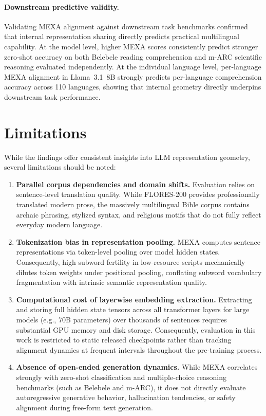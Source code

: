 \paragraph{Downstream predictive validity.}
Validating MEXA alignment against downstream task benchmarks confirmed that internal representation sharing directly predicts practical multilingual capability. At the model level, higher MEXA scores consistently predict stronger zero-shot accuracy on both Belebele reading comprehension and m-ARC scientific reasoning evaluated independently. At the individual language level, per-language MEXA alignment in Llama~3.1~8B strongly predicts per-language comprehension accuracy across 110 languages, showing that internal geometry directly underpins downstream task performance.

\section{Limitations}
\label{sec:conclusion-limitations}

While the findings offer consistent insights into LLM representation geometry, several limitations should be noted:

\begin{enumerate}
    \item \textbf{Parallel corpus dependencies and domain shifts.} Evaluation relies on sentence-level translation quality. While FLORES-200 provides professionally translated modern prose, the massively multilingual Bible corpus contains archaic phrasing, stylized syntax, and religious motifs that do not fully reflect everyday modern language.
    
    \item \textbf{Tokenization bias in representation pooling.} MEXA computes sentence representations via token-level pooling over model hidden states. Consequently, high subword fertility in low-resource scripts mechanically dilutes token weights under positional pooling, conflating subword vocabulary fragmentation with intrinsic semantic representation quality.
    
    \item \textbf{Computational cost of layerwise embedding extraction.} Extracting and storing full hidden state tensors across all transformer layers for large models (e.g., 70B parameters) over thousands of sentences requires substantial GPU memory and disk storage. Consequently, evaluation in this work is restricted to static released checkpoints rather than tracking alignment dynamics at frequent intervals throughout the pre-training process.
    
    \item \textbf{Absence of open-ended generation dynamics.} While MEXA correlates strongly with zero-shot classification and multiple-choice reasoning benchmarks (such as Belebele and m-ARC), it does not directly evaluate autoregressive generative behavior, hallucination tendencies, or safety alignment during free-form text generation.
\end{enumerate}

